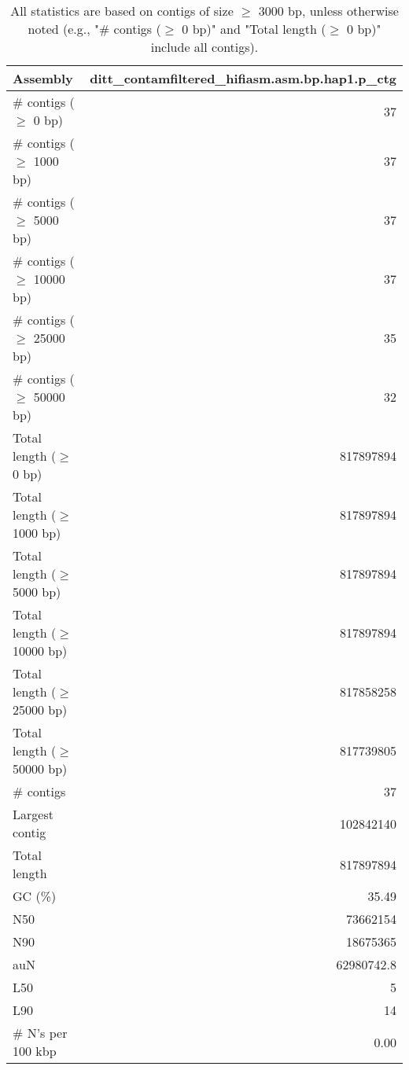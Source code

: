 \documentclass[12pt,a4paper]{article}
\begin{document}
\begin{table}[ht]
\begin{center}
\caption{All statistics are based on contigs of size $\geq$ 3000 bp, unless otherwise noted (e.g., "\# contigs ($\geq$ 0 bp)" and "Total length ($\geq$ 0 bp)" include all contigs).}
\begin{tabular}{|l*{1}{|r}|}
\hline
Assembly & ditt\_contamfiltered\_hifiasm.asm.bp.hap1.p\_ctg \\ \hline
\# contigs ($\geq$ 0 bp) & 37 \\ \hline
\# contigs ($\geq$ 1000 bp) & 37 \\ \hline
\# contigs ($\geq$ 5000 bp) & 37 \\ \hline
\# contigs ($\geq$ 10000 bp) & 37 \\ \hline
\# contigs ($\geq$ 25000 bp) & 35 \\ \hline
\# contigs ($\geq$ 50000 bp) & 32 \\ \hline
Total length ($\geq$ 0 bp) & 817897894 \\ \hline
Total length ($\geq$ 1000 bp) & 817897894 \\ \hline
Total length ($\geq$ 5000 bp) & 817897894 \\ \hline
Total length ($\geq$ 10000 bp) & 817897894 \\ \hline
Total length ($\geq$ 25000 bp) & 817858258 \\ \hline
Total length ($\geq$ 50000 bp) & 817739805 \\ \hline
\# contigs & 37 \\ \hline
Largest contig & 102842140 \\ \hline
Total length & 817897894 \\ \hline
GC (\%) & 35.49 \\ \hline
N50 & 73662154 \\ \hline
N90 & 18675365 \\ \hline
auN & 62980742.8 \\ \hline
L50 & 5 \\ \hline
L90 & 14 \\ \hline
\# N's per 100 kbp & 0.00 \\ \hline
\end{tabular}
\end{center}
\end{table}
\end{document}
